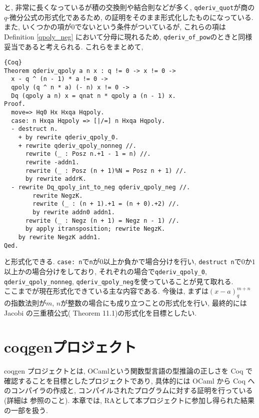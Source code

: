 \documentclass[11pt]{jarticle}
\theoremstyle{mystyle}
\newcommand{\0}{\textbf{0}}
\newcommand{\1}{\textbf{1}}
\newcommand{\2}{\textbf{2}}
\begin{document}
と, 非常に長くなっているが積の交換則や結合則などが多く, {\tt qderiv\_quot}が商の$q$-微分公式の形式化であるため, \cite{Kac}の証明をそのまま形式化したものになっている.  また, いくつかの項が$0$でないという条件がついているが, これらの項は Definition \ref{qpoly_neg} において分母に現れるため, {\tt qderiv\_of\_pow}のときと同様妥当であると考えられる. これらをまとめて, 
\begin{lstlisting}{Coq}
Theorem qderiv_qpoly a n x : q != 0 -> x != 0 ->
  x - q ^ (n - 1) * a != 0 ->
  qpoly (q ^ n * a) (- n) x != 0 ->
  Dq (qpoly a n) x = qnat n * qpoly a (n - 1) x.
Proof.
  move=> Hq0 Hx Hxqa Hqpoly.
  case: n Hxqa Hqpoly => [|/=] n Hxqa Hqpoly.
  - destruct n.
    + by rewrite qderiv_qpoly_0.
    + rewrite qderiv_qpoly_nonneg //.
      rewrite (_ : Posz n.+1 - 1 = n) //.
      rewrite -addn1.
      rewrite (_ : Posz (n + 1)%N = Posz n + 1) //.
      by rewrite addrK.
  - rewrite Dq_qpoly_int_to_neg qderiv_qpoly_neg //.
        rewrite NegzK.
        rewrite (_ : (n + 1).+1 = (n + 0).+2) //.
        by rewrite addn0 addn1.
      rewrite (_ : Negz (n + 1) = Negz n - 1) //.
      by apply itransposition; rewrite NegzK.
    by rewrite NegzK addn1.
Qed.
\end{lstlisting}
と形式化できる. {\tt case:\,n}で{\tt n}が$0$以上か負かで場合分けを行い, {\tt destruct n}で$0$か$1$以上かの場合分けをしており, それぞれの場合で{\tt qderiv\_qpoly\_0}, {\tt qderiv\_qpoly\_nonneg}, {\tt qderiv\_qpoly\_neg}を使っていることが見て取れる. \\
ここまでが現在形式化できている主な内容である. 今後は, まずは$(x - a)^{m + n}_q$の指数法則が$m$, $n$が整数の場合にも成り立つことの形式化を行い, 最終的には Jacobi の三重積公式(\cite{Kac} Theorem 11.1)の形式化を目標としたい. 
\section{coqgenプロジェクト}
coqgen プロジェクトとは, OCamlという関数型言語の型推論の正しさを Coq で確認することを目標としたプロジェクトであり, 具体的には OCaml から Coq へのコンパイラの作成と, コンパイルされたプログラムに対する証明を行っている(詳細は \cite{coqgen} 参照のこと). 本章では, RAとして本プロジェクトに参加し得られた結果の一部を扱う. 
\end{document}
